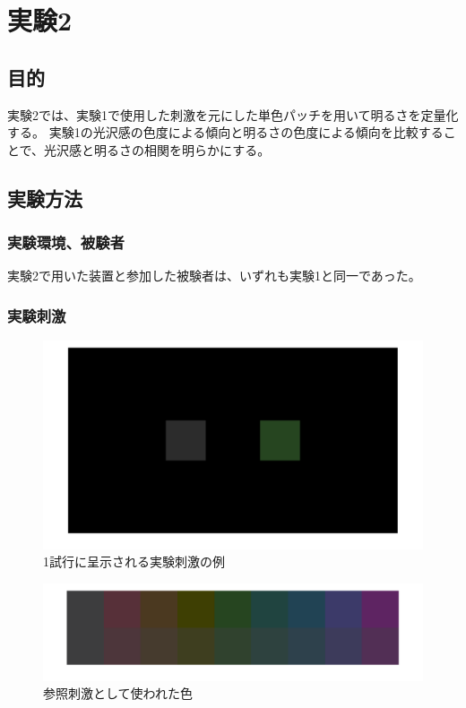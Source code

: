 \chapter{実験2}

\section{目的}

    実験2では、実験1で使用した刺激を元にした単色パッチを用いて明るさを定量化する。
    実験1の光沢感の色度による傾向と明るさの色度による傾向を比較することで、光沢感と明るさの相関を明らかにする。


\section{実験方法}
    \subsection{実験環境、被験者}

        実験2で用いた装置と参加した被験者は、いずれも実験1と同一であった。

    \subsection{実験刺激}

        \begin{figure}
            \centering
            \includegraphics[width=14.0cm]{./img/ex2_stimuli2.png}
            \caption{1試行に呈示される実験刺激の例}
            \label{ex1_procedure}
        \end{figure}

        \begin{figure}
            \centering
            \includegraphics[width=14.0cm]{./img/patchStimuli.png}
            \caption{参照刺激として使われた色}
            \label{ex1_procedure}
        \end{figure}

